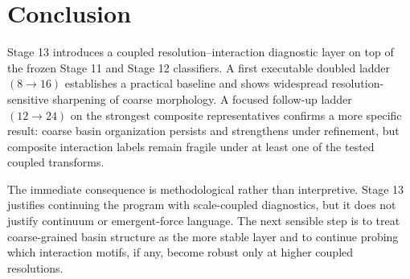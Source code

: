 \documentclass[11pt]{article}
\begin{document}
\section{Conclusion}

Stage 13 introduces a coupled resolution--interaction diagnostic layer on top of the frozen Stage 11 and Stage 12 classifiers. A first executable doubled ladder $(8 \rightarrow 16)$ establishes a practical baseline and shows widespread resolution-sensitive sharpening of coarse morphology. A focused follow-up ladder $(12 \rightarrow 24)$ on the strongest composite representatives confirms a more specific result: coarse basin organization persists and strengthens under refinement, but composite interaction labels remain fragile under at least one of the tested coupled transforms.

The immediate consequence is methodological rather than interpretive. Stage 13 justifies continuing the program with scale-coupled diagnostics, but it does not justify continuum or emergent-force language. The next sensible step is to treat coarse-grained basin structure as the more stable layer and to continue probing which interaction motifs, if any, become robust only at higher coupled resolutions.
\end{document}
